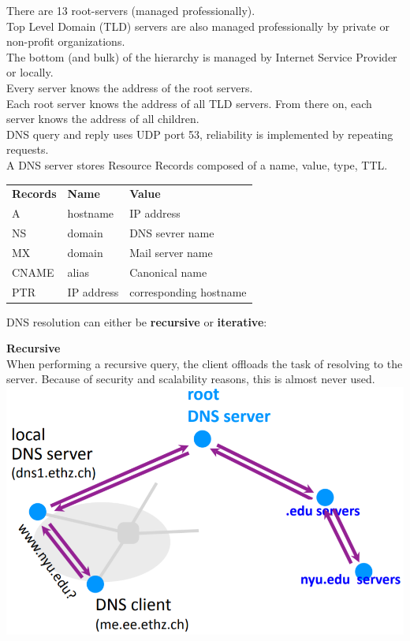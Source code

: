 \documentclass[a4paper, fontsize=8pt, landscape, DIV=1]{scrartcl}
\begin{document}
\begin{multicols*}{4}
		There are 13 root-servers (managed professionally).\\
		Top Level Domain (TLD) servers are also managed professionally by private or non-profit organizations.\\
		The bottom (and bulk) of the hierarchy is managed by Internet Service Provider or locally. \\
		Every server knows the address of the root servers.\\
		Each root server knows the address of all TLD servers. From there on, each server knows the address of all children.\\
		DNS query and reply uses UDP port 53, reliability is implemented by repeating requests.\\
		A DNS server stores Resource Records composed of a name, value, type, TTL.
		\vspace{0.2cm}
		
		\begin{tabular}{l l l}
			\textbf{Records} & \textbf{Name}  & \textbf{Value} \\ 
			A	  & hostname   & IP address  \\ 
			NS	  & domain 	   & DNS sevrer name \\ 
			MX	  & domain 	   & Mail server name \\ 
			CNAME & alias 	   & Canonical name \\  
			PTR	  & IP address & corresponding hostname \\ 
		\end{tabular} 
	
		DNS resolution can either be \textbf{recursive} or \textbf{iterative}:\par
		
		\textbf{Recursive}\\
		When performing a recursive query, the client offloads  the task of resolving to the server. 
		Because of security and scalability reasons, this is almost never used.\\
		\includegraphics[width=\columnwidth]{images/Application_Layer/dns_recursive.png}
		\par 
		

\end{multicols*}
\end{document}
